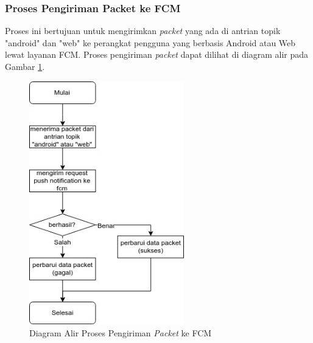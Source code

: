 \subsubsection{Proses Pengiriman Packet ke FCM}
\par Proses ini bertujuan untuk mengirimkan \textit{packet} yang ada di antrian topik "android" dan "web" ke perangkat pengguna yang berbasis Android atau Web lewat layanan FCM. Proses pengiriman \textit{packet} dapat dilihat di diagram alir pada Gambar \ref{flowchart_pengiriman_packet_ke_fcm}.
\begin{figure}[hb]
	\caption{Diagram Alir Proses Pengiriman \textit{Packet} ke FCM} \label{flowchart_pengiriman_packet_ke_fcm}
    \centering\includegraphics[width=0.6\textwidth]{bab3/figures/flowchart_pengiriman_packet_ke_fcm.jpg}
\end{figure}
